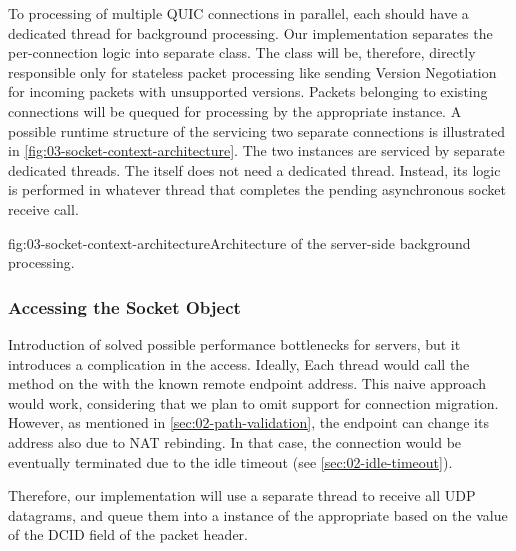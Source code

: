 To processing of multiple QUIC connections in parallel, each \QuicConnection{} should
have a dedicated thread for background processing. Our implementation separates the per-connection
logic into separate \QuicConnectionContext{} class. The \QuicSocketContext{} class will be,
therefore, directly responsible only for stateless packet processing like sending Version
Negotiation for incoming packets with unsupported versions. Packets belonging to existing
connections will be quequed for processing by the appropriate \QuicConnectionContext{} instance. A
possible runtime structure of the \QuicSocketContext{} servicing two separate connections is
illustrated in \autoref{fig:03-socket-context-architecture}. The two \QuicConnectionContext{}
instances are serviced by separate dedicated threads. The \QuicSocketContext{} itself does not need
a dedicated thread. Instead, its logic is performed in whatever thread that completes the pending
asynchronous socket receive call.

\begin{myFigure}{fig:03-socket-context-architecture}{Architecture of the server-side background processing.}

\resizebox{\linewidth}{!}{}

\end{myFigure}

\subsubsection{Accessing the Socket Object}

Introduction of \QuicConnectionContext{} solved possible performance bottlenecks for servers, but it
introduces a complication in the \Socket{} access. Ideally, Each thread would call the
 method on the \Socket{} with the known remote endpoint address. This
naive approach would work, considering that we plan to omit support for connection migration.
However, as mentioned in \autoref{sec:02-path-validation}, the endpoint can change its address also
due to NAT rebinding. In that case, the connection would be eventually terminated due to the idle
timeout (see \autoref{sec:02-idle-timeout}).

Therefore, our implementation will use a separate thread to receive all UDP datagrams, and queue
them into a  instance of the appropriate \QuicConnectionContext{} based on the
value of the DCID field of the packet header.

